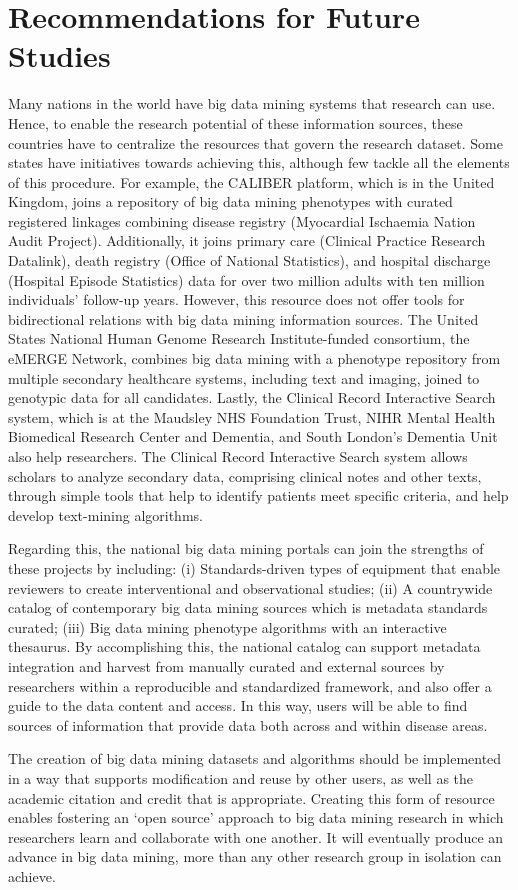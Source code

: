 \documentclass[sigconf]{acmart}
\begin{document}
\section{Recommendations for Future Studies}
Many nations in the world have big data mining systems that research can use.  Hence, to enable the research potential of these information sources, these countries have to centralize the resources that govern the research dataset.
Some states have initiatives towards achieving this, although few tackle all the elements of this procedure.
For example, the CALIBER platform, which is in the United Kingdom, joins a repository of big data mining phenotypes with curated registered linkages combining disease registry (Myocardial Ischaemia Nation Audit Project).
Additionally, it joins primary care (Clinical Practice Research Datalink), death registry (Office of National Statistics), and hospital discharge (Hospital Episode Statistics) data for over two million adults with ten million individuals’ follow-up years.
However, this resource does not offer tools for bidirectional relations with big data mining information sources.
The United States National Human Genome Research Institute-funded consortium, the eMERGE Network, combines big data mining with a phenotype repository from multiple secondary healthcare systems, including text and imaging, joined to genotypic data for all candidates.
Lastly, the Clinical Record Interactive Search system, which is at the Maudsley NHS Foundation Trust, NIHR Mental Health Biomedical Research Center and Dementia, and South London's Dementia Unit also help researchers.
The Clinical Record Interactive Search system allows scholars to analyze secondary data, comprising clinical notes and other texts, through simple tools that help to identify patients meet specific criteria, and help develop text-mining algorithms.
\par Regarding this, the national big data mining portals can join the strengths of these projects by including: (i) Standards-driven types of equipment that enable reviewers to create interventional and observational studies;
(ii) A countrywide catalog of contemporary big data mining sources which is metadata standards curated;
(iii)  Big data mining phenotype algorithms with an interactive thesaurus.
By accomplishing this, the national catalog can support metadata integration and harvest from manually curated and external sources by researchers within a reproducible and standardized framework, and also offer a guide to the data content and access.
In this way, users will be able to find sources of information that provide data both across and within disease areas.
\par The creation of big data mining datasets and algorithms should be implemented in a way that supports modification and reuse by other users, as well as the academic citation and credit that is appropriate.
Creating this form of resource enables fostering an `open source' approach to big data mining research in which researchers learn and collaborate with one another.
It will eventually produce an advance in big data mining, more than any other research group in isolation can achieve.
\end{document}

